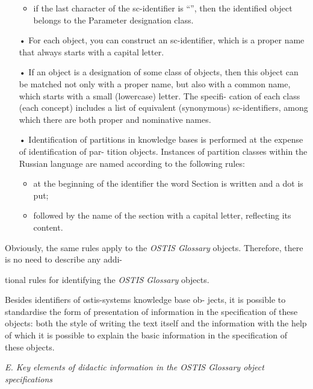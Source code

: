 \documentclass{article}
\begin{document}
\begin{multicols}{2}
\begin{itemize}
\begin{itemize}
\item if the last character of the sc-identifier is “”,
then the identified object belongs to the Parameter
designation class.
\end{itemize}
\item[•]For each object, you can construct an sc-identifier,
which is a proper name that always starts with a
capital letter.
\item[•]If an object is a designation of some class of objects,
then this object can be matched not only with a
proper name, but also with a common name, which
starts with a small (lowercase) letter. The specifi-
cation of each class (each concept) includes a list
of equivalent (synonymous) sc-identifiers, among
which there are both proper and nominative names.
\item[•]Identification of partitions in knowledge bases is
performed at the expense of identification of par-
tition objects. Instances of partition classes within
the Russian language are named according to the
following rules:
\begin{itemize}
\item at the beginning of the identifier the word Section
is written and a dot is put;
\item followed by the name of the section with a capital
letter, reflecting its content.
\end{itemize}
\end{itemize}

Obviously, the same rules apply to the \textit{OSTIS Glossary}
objects. Therefore, there is no need to describe any addi-

tional rules for identifying the \textit{OSTIS Glossary} objects.

\quad
Besides identifiers of ostis-systems knowledge base ob-
jects, it is possible to standardise the form of presentation
of information in the specification of these objects: both
the style of writing the text itself and the information
with the help of which it is possible to explain the basic
information in the specification of these objects.

\textit{E. Key elements of didactic information in the OSTIS
Glossary object specifications}


\end{multicols}
\end{document}
